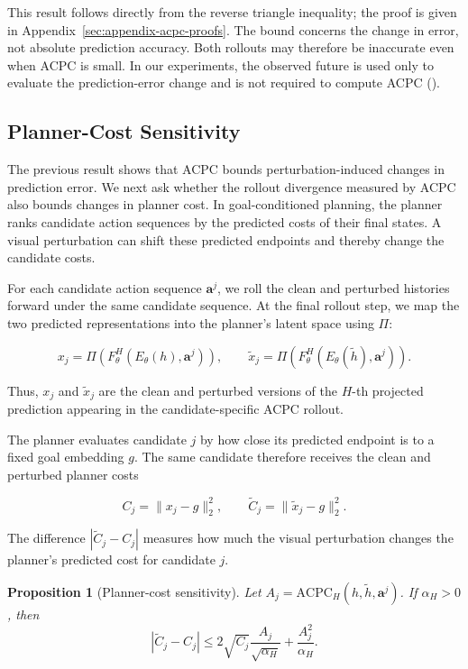 \documentclass{article}
\newtheorem{proposition}{Proposition}
\begin{document}
This result follows directly from the reverse triangle inequality; the proof
is given in Appendix~\ref{sec:appendix-acpc-proofs}. The bound concerns the
change in error, not absolute prediction accuracy. Both
rollouts may therefore be inaccurate even when ACPC is small. In our
experiments, the observed future is used only to evaluate the prediction-error
change and is not required to compute ACPC
().


\subsection{Planner-Cost Sensitivity}

The previous result shows that ACPC bounds perturbation-induced changes in
prediction error. We next ask whether the rollout divergence measured by ACPC
also bounds changes in planner cost. In goal-conditioned planning, the
planner ranks candidate action sequences by the predicted costs of their final
states. A visual perturbation can shift these predicted endpoints and thereby
change the candidate costs.

For each candidate action sequence $\mathbf a^j$, we roll the clean and
perturbed histories forward under the same candidate sequence. At the final
rollout step, we map the two predicted representations into the planner's
latent space using $\Pi$:

$$
x_j=\Pi(F_\theta^H(E_\theta(h),\mathbf a^j)),
\qquad
\tilde x_j=\Pi(F_\theta^H(E_\theta(\tilde h),\mathbf a^j)).
$$

Thus, $x_j$ and $\tilde x_j$ are the clean and perturbed versions of the
$H$-th projected prediction appearing in the candidate-specific ACPC rollout.

The planner evaluates candidate $j$ by how close its predicted endpoint is to
a fixed goal embedding $g$. The same candidate therefore receives the clean
and perturbed planner costs

$$
C_j=\|x_j-g\|_2^2,
\qquad
\tilde C_j=\|\tilde x_j-g\|_2^2.
$$

The difference $|\tilde C_j-C_j|$ measures how much the visual perturbation
changes the planner's predicted cost for candidate $j$.

\begin{proposition}[Planner-cost sensitivity]
\label{prop:exact-cost-certificate}
Let $A_j=\mathrm{ACPC}_H(h,\tilde h,\mathbf a^j)$. If $\alpha_H>0$, then
\begin{equation}
|\tilde C_j-C_j|
\leq
2\sqrt{C_j}\frac{A_j}{\sqrt{\alpha_H}}
+\frac{A_j^2}{\alpha_H}.
\label{eq:exact-cost-bound}
\end{equation}
\end{proposition}
\end{document}
